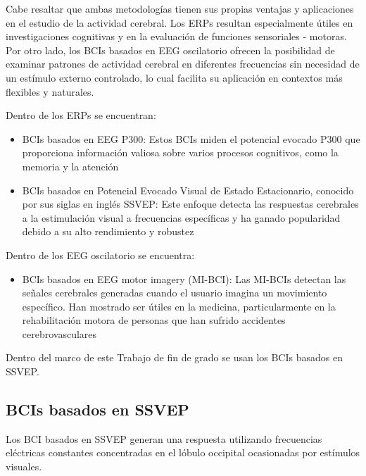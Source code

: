 Cabe resaltar que ambas metodologías tienen sus propias ventajas y aplicaciones en el estudio de la actividad cerebral. Los ERPs resultan especialmente útiles en investigaciones cognitivas y en la evaluación de funciones sensoriales - motoras. Por otro lado, los BCIs basados en EEG oscilatorio ofrecen la posibilidad de examinar patrones de actividad cerebral en diferentes frecuencias sin necesidad de un estímulo externo controlado, lo cual facilita su aplicación en contextos más flexibles y naturales.

Dentro de los ERPs se encuentran:

\begin{itemize}
  \item BCIs basados en EEG P300: Estos BCIs miden el potencial evocado P300 que proporciona información valiosa sobre varios procesos cognitivos, como la memoria y la atención \cite{ComparisonAuditoryTemporalLobeEpilepsy}
  
  \item BCIs basados en Potencial Evocado Visual de Estado Estacionario, conocido por sus siglas en inglés SSVEP: Este enfoque detecta las respuestas cerebrales a la estimulación visual a frecuencias específicas y ha ganado popularidad debido a su alto rendimiento y robustez \cite{SSVEPBCI}
\end{itemize}

Dentro de los EEG oscilatorio se encuentra:

\begin{itemize}
  \item BCIs basados en EEG motor imagery (MI-BCI): Las MI-BCIs detectan las señales cerebrales generadas cuando el usuario imagina un movimiento específico. Han mostrado ser útiles en la medicina, particularmente en la rehabilitación motora de personas que han sufrido accidentes cerebrovasculares \cite{MotorImageryRoboticFeedback}
\end{itemize}

Dentro del marco de este Trabajo de fin de grado se usan los BCIs basados en SSVEP.

\subsection{BCIs basados en SSVEP}

Los BCI basados en SSVEP generan una respuesta utilizando frecuencias eléctricas constantes concentradas en el lóbulo occipital ocasionadas por estímulos visuales.



